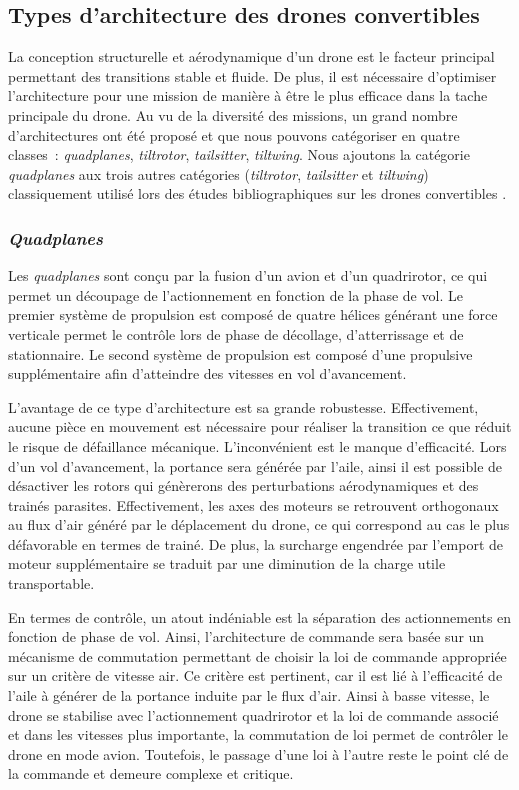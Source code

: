     \subsection{Types d'architecture des drones convertibles}
    La conception structurelle et aérodynamique d'un drone est le facteur principal permettant des transitions stable et fluide. De plus, il est nécessaire d'optimiser l'architecture pour une mission de manière à être le plus efficace dans la tache principale du drone. Au vu de la diversité des missions, un grand nombre d'architectures ont été proposé et que nous pouvons catégoriser en quatre classes : \textit{quadplanes}, \textit{tiltrotor}, \textit{tailsitter}, \textit{tiltwing}. Nous ajoutons la catégorie \textit{quadplanes} aux trois autres catégories (\textit{tiltrotor}, \textit{tailsitter} et \textit{tiltwing}) classiquement utilisé lors des études bibliographiques sur les drones convertibles \cite{saeed_survey_2018,ducard_review_2021}.
        \subsubsection*{\textit{Quadplanes}}
        Les \textit{quadplanes} sont conçu par la fusion d'un avion et d'un quadrirotor, ce qui permet un découpage de l'actionnement en fonction de la phase de vol. Le premier système de propulsion est composé de quatre hélices générant une force verticale permet le contrôle lors de phase de décollage, d'atterrissage et de stationnaire. Le second système de propulsion est composé d'une  propulsive supplémentaire afin d'atteindre des vitesses en vol d'avancement.

        L'avantage de ce type d'architecture est sa grande robustesse. Effectivement, aucune pièce en mouvement est nécessaire pour réaliser la transition ce que réduit le risque de défaillance mécanique. L'inconvénient est le manque d'efficacité. Lors d'un vol d'avancement, la portance sera générée par l'aile, ainsi il est possible de désactiver les rotors qui génèrerons des perturbations aérodynamiques et des trainés parasites. Effectivement, les axes des moteurs se retrouvent orthogonaux au flux d'air généré par le déplacement du drone, ce qui correspond au cas le plus défavorable en termes de trainé. De plus, la surcharge engendrée par l'emport de moteur supplémentaire se traduit par une diminution de la charge utile transportable. 

        En termes de contrôle, un atout indéniable est la séparation des actionnements en fonction de phase de vol. Ainsi, l'architecture de commande sera basée sur un mécanisme de commutation permettant de choisir la loi de commande appropriée sur un critère de vitesse air. Ce critère est pertinent, car il est lié à l'efficacité de l'aile à générer de la portance induite par le flux d'air. Ainsi à basse vitesse, le drone se stabilise avec l'actionnement quadrirotor et la loi de commande associé et dans les vitesses plus importante, la commutation de loi permet de contrôler le drone en mode avion. Toutefois, le passage d'une loi à l'autre reste le point clé de la commande et demeure complexe et critique.

